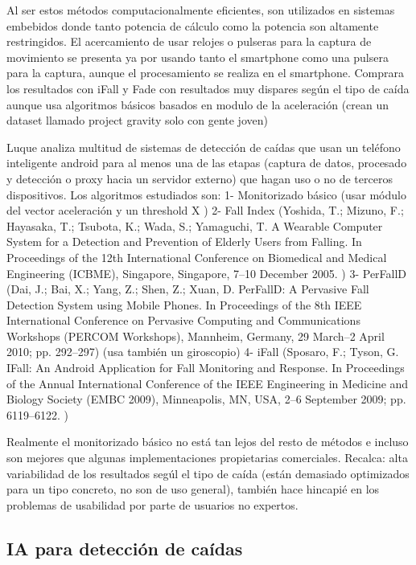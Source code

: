 \documentclass[../tfm.tex]{subfiles}
\begin{document}
Al ser estos métodos computacionalmente eficientes, son utilizados en sistemas embebidos donde tanto potencia de cálculo como la potencia son altamente restringidos. El acercamiento de usar relojes o pulseras para la captura de movimiento se presenta ya por \cite{Vilarinho2015} usando tanto el smartphone como una pulsera para la captura, aunque el procesamiento se realiza en el smartphone. Comprara los resultados con iFall y Fade con resultados muy dispares según el tipo de caída aunque usa algoritmos básicos basados en modulo de la aceleración \cite{fallIndex00} (crean un dataset llamado project gravity solo con gente joven)

Luque\cite{Luque2014} analiza multitud de sistemas de detección de caídas que usan un teléfono inteligente android para al menos una de las etapas (captura de datos, procesado y detección o proxy hacia un servidor externo) que hagan uso o no de terceros dispositivos. Los algoritmos estudiados son:
1- Monitorizado básico (usar módulo del vector aceleración y un threshold X )
2- Fall Index (Yoshida,  T.;  Mizuno,  F.;  Hayasaka,  T.;  Tsubota,  K.;  Wada,  S.;  Yamaguchi,  T.  A  Wearable  Computer System for a Detection and Prevention of Elderly Users from Falling. In Proceedings of  the  12th  International  Conference  on  Biomedical  and  Medical  Engineering  (ICBME),  Singapore, Singapore, 7–10 December 2005.  )
3- PerFallD (Dai, J.; Bai, X.; Yang, Z.; Shen, Z.; Xuan, D. PerFallD: A Pervasive Fall Detection System using Mobile   Phones.   In   Proceedings   of   the   8th   IEEE   International   Conference   on   Pervasive   Computing  and  Communications  Workshops  (PERCOM  Workshops),  Mannheim,  Germany,    29 March–2 April 2010; pp. 292–297) (usa también un giroscopio)
4- iFall (Sposaro,  F.;  Tyson,  G.  IFall:  An  Android  Application  for  Fall  Monitoring  and  Response.    In Proceedings of the Annual International Conference of the IEEE Engineering in Medicine and Biology Society (EMBC 2009), Minneapolis, MN, USA, 2–6 September 2009; pp. 6119–6122. )

Realmente el monitorizado básico no está tan lejos del resto de métodos e incluso son mejores que algunas implementaciones propietarias comerciales.
Recalca: alta variabilidad de los resultados segúl el tipo de caída (están demasiado optimizados para un tipo concreto, no son de uso general), también hace hincapié en los problemas de usabilidad por parte de usuarios no expertos.


\subsection{IA para detección de caídas}
\end{document}
